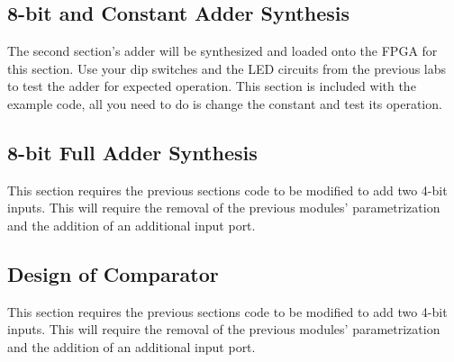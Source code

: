 \documentclass[12pt,journal]{IEEEtran}
\begin{document}
  \subsection{8-bit and Constant Adder Synthesis}
    The second section's adder will be synthesized and loaded onto the FPGA for this section. Use your dip switches and the LED circuits from the previous labs to test the adder for expected operation. This section is included with the example code, all you need to do is change the constant and test its operation.  

  \subsection{8-bit Full Adder Synthesis}
    This section requires the previous sections code to be modified to add two 4-bit inputs. This will require the removal of the previous modules' parametrization and the addition of an additional input port. 

  \subsection{Design of Comparator}
    This section requires the previous sections code to be modified to add two 4-bit inputs. This will require the removal of the previous modules' parametrization and the addition of an additional input port. 

  
  
\end{document}
